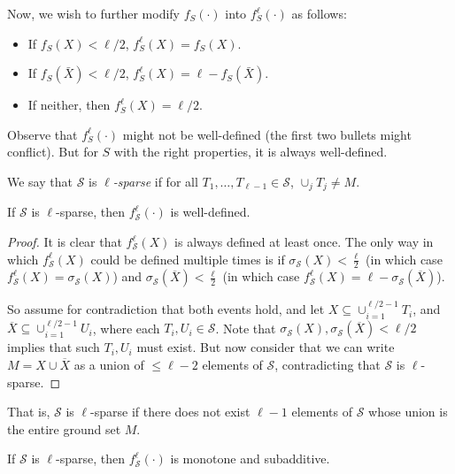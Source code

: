   Now, we wish to further modify $f_S(\cdot)$ into $f_S^\ell(\cdot)$ as follows:
  \begin{itemize} \item If $f_S(X) < \ell/2$, $f_S^\ell(X) = f_S(X)$.  \item If
      $f_S(\bar{X}) < \ell/2$, $f_S^\ell(X) = \ell - f_S(\bar{X})$.  \item If
        neither, then $f_S^\ell(X) = \ell/2$.  \end{itemize}

  Observe that $f_S^\ell(\cdot)$ might not be well-defined (the first two bullets
  might conflict). But for $S$ with the right properties, it is always
  well-defined. 

  \begin{definition} We say that $\mathcal{S}$ is
  \emph{$\ell$-sparse} if for all $T_1,\ldots, T_{\ell-1} \in \mathcal{S}$,
  $\cup_j T_j \neq M$. \end{definition}

  \begin{lemma} If $\mathcal{S}$ is $\ell$-sparse, then
  $f^\ell_\mathcal{S}(\cdot)$ is well-defined.  \end{lemma}

  \begin{proof} It is clear that $f^\ell_\mathcal{S}(X)$ is always defined at
    least once. The only way in which $f^\ell_\mathcal{S}(X)$ could be defined
    multiple times is if $\sigma_\mathcal{S}(X) < \frac{\ell}{2}$ (in which case
    $f^\ell_\mathcal{S}(X) = \sigma_\mathcal{S}(X)$) and
    $\sigma_\mathcal{S}(\overline{X}) < \frac{\ell}{2}$ (in which case
    $f^\ell_\mathcal{S}(X) = \ell - \sigma_\mathcal{S}(\overline{X})$). 

  So assume for contradiction that both events hold, and let $X \subseteq
  \cup_{i=1}^{\ell/2-1} T_i$, and $\overline{X} \subseteq \cup_{i=1}^{\ell/2-1}
  U_i$, where each $T_i, U_i \in \mathcal{S}$. Note that $\sigma_\mathcal{S}(X),
  \sigma_\mathcal{S}(\overline{X}) < \ell/2$ implies that such $T_i, U_i$ must
  exist. But now consider that we can write $M = X \cup \overline{X}$ as a union
  of $\leq \ell -2$ elements of $\mathcal{S}$, contradicting that $\mathcal{S}$ is
  $\ell$-sparse.  \end{proof} That is, $\mathcal{S}$ is $\ell$-sparse if there
  does not exist $\ell-1$ elements of $\mathcal{S}$ whose union is the entire
  ground set $M$. 

  \begin{proposition} If $\mathcal{S}$ is $\ell$-sparse, then
  $f^\ell_\mathcal{S}(\cdot)$ is monotone and subadditive.  \end{proposition}

